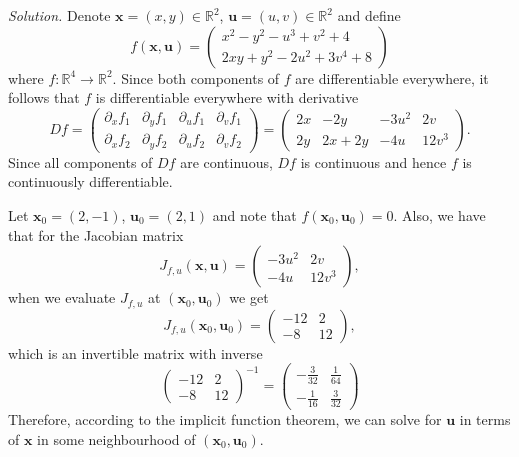 \documentclass{article}
\newcommand{\0}{\mathbf{0}}
\newcommand{\bx}{\mathbf{x}}
\newcommand{\bu}{\mathbf{u}}
\newcommand{\R}{\mathbb{R}}
\begin{document}
\textit{Solution.}
Denote $\bx = (x, y) \in \R^2$, $\bu = (u, v) \in \R^2$ and define
%
\begin{equation*}
    f(\bx, \bu) =
        \begin{pmatrix}
            x^2 - y^2 - u^3 + v^2 + 4 \\
            2 x y + y^2 - 2 u^2 + 3 v^4 + 8
        \end{pmatrix}
\end{equation*}
%
where $f: \R^4 \to \R^2$. Since both components of $f$ are
differentiable everywhere, it follows that $f$ is differentiable
everywhere with derivative
%
\begin{equation*}
    D f =
        \begin{pmatrix}
            \partial_x f_1 & \partial_y f_1 & \partial_u f_1 & \partial_v f_1 \\
            \partial_x f_2 & \partial_y f_2 & \partial_u f_2 & \partial_v f_2
        \end{pmatrix}
        =
        \begin{pmatrix}
            2x & -2y & -3u^2 & 2v \\
            2y & 2x + 2y & -4u & 12v^3
        \end{pmatrix}
        .
\end{equation*}
%
Since all components of $D f$ are continuous, $D f$ is continuous and
hence $f$ is continuously differentiable.

Let $\bx_0 = (2, -1)$, $\bu_0 = (2, 1)$ and note that $f(\bx_0, \bu_0) =
0$. Also, we have that for the Jacobian matrix
%
\begin{equation*}
    J_{f, u} (\bx, \bu) =
        \begin{pmatrix}
            -3u^2 & 2v \\
            -4u & 12v^3
        \end{pmatrix}
        ,
\end{equation*}
%
when we evaluate $J_{f, u}$ at $(\bx_0, \bu_0)$ we get
%
\begin{equation*}
    J_{f, u} (\bx_0, \bu_0) =
        \begin{pmatrix}
            -12 & 2 \\
            -8 & 12
        \end{pmatrix}
        ,
\end{equation*}
%
which is an invertible matrix with inverse
%
\begin{equation*}
    \begin{pmatrix}
        -12 & 2 \\
        -8 & 12
    \end{pmatrix}^{-1}
    =
    \begin{pmatrix}
        -\frac{3}{32} & \frac{1}{64} \\[4pt]
        -\frac{1}{16} & \frac{3}{32}
    \end{pmatrix}
\end{equation*}
%
Therefore, according to the implicit function theorem, we can solve for
$\bu$ in terms of $\bx$ in some neighbourhood of $(\bx_0, \bu_0)$.
\end{document}
